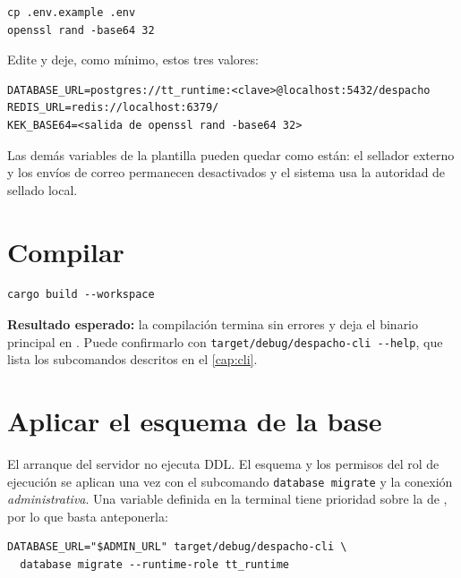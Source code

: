 \begin{verbatim}
cp .env.example .env
openssl rand -base64 32
\end{verbatim}

Edite  y deje, como mínimo, estos tres valores:

\begin{verbatim}
DATABASE_URL=postgres://tt_runtime:<clave>@localhost:5432/despacho
REDIS_URL=redis://localhost:6379/
KEK_BASE64=<salida de openssl rand -base64 32>
\end{verbatim}

Las demás variables de la plantilla pueden quedar como están: el sellador
externo y los envíos de correo permanecen desactivados y el sistema usa la
autoridad de sellado local.


\section{Compilar}\label{sec:inst-compilar}

\begin{verbatim}
cargo build --workspace
\end{verbatim}

\textbf{Resultado esperado:} la compilación termina sin errores y deja el
binario principal en . Puede confirmarlo
con \texttt{target/debug/despacho-cli -{}-help}, que lista los subcomandos
descritos en el \cref{cap:cli}.

\section{Aplicar el esquema de la base}\label{sec:inst-migrar}

El arranque del servidor no ejecuta DDL. El esquema y los permisos del rol
de ejecución se aplican una vez con el subcomando \texttt{database migrate} y
la conexión \emph{administrativa}. Una variable definida en la terminal
tiene prioridad sobre la de , por lo que basta anteponerla:

\begin{verbatim}
DATABASE_URL="$ADMIN_URL" target/debug/despacho-cli \
  database migrate --runtime-role tt_runtime
\end{verbatim}


